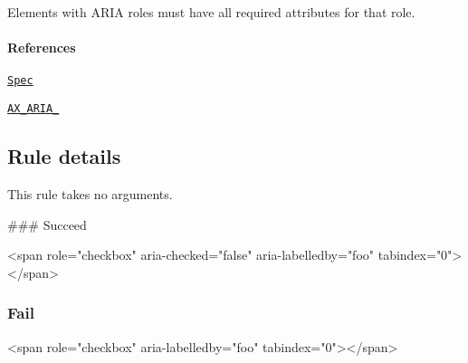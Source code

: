 Elements with A\+R\+IA roles must have all required attributes for that role.

\paragraph*{References}


\begin{DoxyEnumerate}
\item \href{https://www.w3.org/TR/wai-aria/roles}{\tt Spec}
\item \href{https://github.com/GoogleChrome/accessibility-developer-tools/wiki/Audit-Rules#ax_aria_03}{\tt A\+X\+\_\+\+A\+R\+I\+A\+\_}
\end{DoxyEnumerate}

\subsection*{Rule details}

This rule takes no arguments.

\#\#\# Succeed 
\begin{DoxyCode}
<span role="checkbox" aria-checked="false" aria-labelledby="foo" tabindex="0"></span>
\end{DoxyCode}


\subsubsection*{Fail}


\begin{DoxyCode}
<span role="checkbox" aria-labelledby="foo" tabindex="0"></span>
\end{DoxyCode}
 